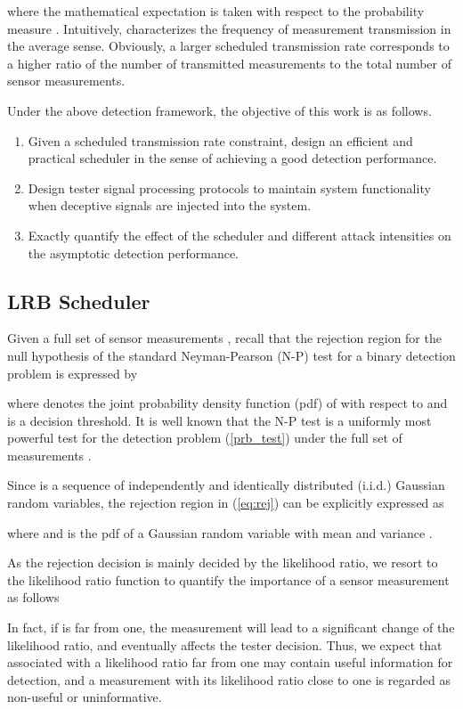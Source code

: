 \documentclass[journal]{IEEEtran}
\begin{document}
where the mathematical expectation  is taken with respect to the probability measure .
Intuitively,  characterizes the frequency of measurement transmission in the average sense. Obviously, a larger scheduled transmission rate corresponds to a higher ratio of the number of transmitted measurements to the total number of sensor measurements.

Under the above detection framework, the objective of this work is as follows.
\begin{enumerate}
 \item Given a scheduled transmission rate constraint, design an efficient and practical scheduler in the sense of achieving a good detection performance.
 \item Design tester signal processing protocols to maintain system functionality when deceptive signals are injected into the system.
\item  Exactly quantify the effect of the scheduler and different attack intensities on the asymptotic detection performance.
\end{enumerate}



\subsection{LRB Scheduler}
Given a full set of sensor measurements ,  recall that the rejection region for the null hypothesis of the standard Neyman-Pearson (N-P) test for a binary detection problem is expressed by

where   denotes the joint probability density function (pdf) of  with respect to  and  is a decision threshold. It is well known that
the N-P test is a uniformly most powerful test for the detection problem (\ref{prb_test}) under the full set of measurements .

Since  is a sequence of independently and identically distributed (i.i.d.) Gaussian random variables,
the rejection region in (\ref{eq:rej}) can be explicitly expressed as

where  and  is the pdf of a Gaussian random variable with mean  and variance .

As the rejection decision is mainly decided by the likelihood ratio, we resort to the likelihood ratio function to quantify the importance of a sensor measurement as follows


In fact, if  is far from one, the measurement  will lead to a significant change of the likelihood ratio, and eventually affects the tester decision. Thus, we expect that  associated with a likelihood ratio far from one may contain useful information for detection, and a measurement with its likelihood ratio close to one is regarded as non-useful or uninformative.
\end{document}
